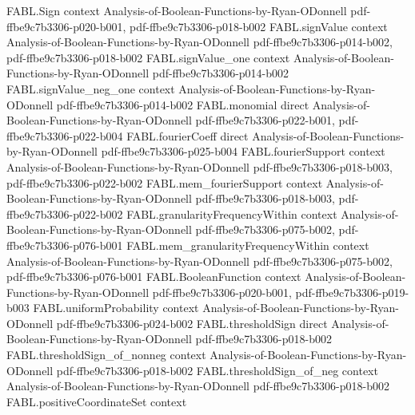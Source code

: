 \begin{theorem}
\label{FABL.booleanInfluence_const}
\leanok
{}
\proofstep
  {FABL.Sign}
  {context}
  {Analysis-of-Boolean-Functions-by-Ryan-ODonnell}
  {pdf-ffbe9c7b3306-p020-b001,
    pdf-ffbe9c7b3306-p018-b002}
\proofstep
  {FABL.signValue}
  {context}
  {Analysis-of-Boolean-Functions-by-Ryan-ODonnell}
  {pdf-ffbe9c7b3306-p014-b002,
    pdf-ffbe9c7b3306-p018-b002}
\proofstep
  {FABL.signValue_one}
  {context}
  {Analysis-of-Boolean-Functions-by-Ryan-ODonnell}
  {pdf-ffbe9c7b3306-p014-b002}
\proofstep
  {FABL.signValue_neg_one}
  {context}
  {Analysis-of-Boolean-Functions-by-Ryan-ODonnell}
  {pdf-ffbe9c7b3306-p014-b002}
\proofstep
  {FABL.monomial}
  {direct}
  {Analysis-of-Boolean-Functions-by-Ryan-ODonnell}
  {pdf-ffbe9c7b3306-p022-b001,
    pdf-ffbe9c7b3306-p022-b004}
\proofstep
  {FABL.fourierCoeff}
  {direct}
  {Analysis-of-Boolean-Functions-by-Ryan-ODonnell}
  {pdf-ffbe9c7b3306-p025-b004}
\proofstep
  {FABL.fourierSupport}
  {context}
  {Analysis-of-Boolean-Functions-by-Ryan-ODonnell}
  {pdf-ffbe9c7b3306-p018-b003,
    pdf-ffbe9c7b3306-p022-b002}
\proofstep
  {FABL.mem_fourierSupport}
  {context}
  {Analysis-of-Boolean-Functions-by-Ryan-ODonnell}
  {pdf-ffbe9c7b3306-p018-b003,
    pdf-ffbe9c7b3306-p022-b002}
\proofstep
  {FABL.granularityFrequencyWithin}
  {context}
  {Analysis-of-Boolean-Functions-by-Ryan-ODonnell}
  {pdf-ffbe9c7b3306-p075-b002,
    pdf-ffbe9c7b3306-p076-b001}
\proofstep
  {FABL.mem_granularityFrequencyWithin}
  {context}
  {Analysis-of-Boolean-Functions-by-Ryan-ODonnell}
  {pdf-ffbe9c7b3306-p075-b002,
    pdf-ffbe9c7b3306-p076-b001}
\proofstep
  {FABL.BooleanFunction}
  {context}
  {Analysis-of-Boolean-Functions-by-Ryan-ODonnell}
  {pdf-ffbe9c7b3306-p020-b001,
    pdf-ffbe9c7b3306-p019-b003}
\proofstep
  {FABL.uniformProbability}
  {context}
  {Analysis-of-Boolean-Functions-by-Ryan-ODonnell}
  {pdf-ffbe9c7b3306-p024-b002}
\proofstep
  {FABL.thresholdSign}
  {direct}
  {Analysis-of-Boolean-Functions-by-Ryan-ODonnell}
  {pdf-ffbe9c7b3306-p018-b002}
\proofstep
  {FABL.thresholdSign_of_nonneg}
  {context}
  {Analysis-of-Boolean-Functions-by-Ryan-ODonnell}
  {pdf-ffbe9c7b3306-p018-b002}
\proofstep
  {FABL.thresholdSign_of_neg}
  {context}
  {Analysis-of-Boolean-Functions-by-Ryan-ODonnell}
  {pdf-ffbe9c7b3306-p018-b002}
\proofstep
  {FABL.positiveCoordinateSet}
  {context}

\end{theorem}
